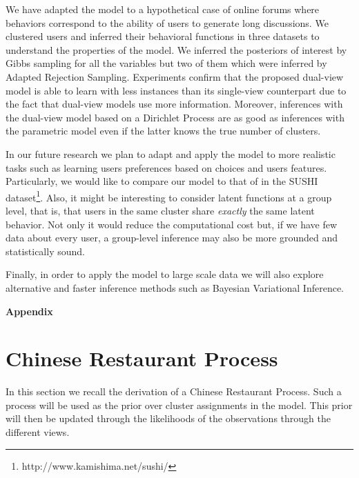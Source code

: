 \documentclass[smallextended]{svjour3}          %
\begin{document}
We have adapted the model to a hypothetical case of online forums where behaviors correspond to the ability of users to generate long discussions. We clustered users and inferred their behavioral functions in three datasets to understand the properties of the model. We inferred the posteriors of interest by Gibbs sampling for all the variables but two of them which were inferred by Adapted Rejection Sampling. Experiments confirm that the proposed dual-view model is able to learn with less instances than its single-view counterpart due to the fact that dual-view models use more information. Moreover, inferences with the dual-view model based on a Dirichlet Process are as good as inferences with the parametric model even if the latter knows the true number of clusters.

In our future research we plan to adapt and apply the model to more realistic tasks such as learning users preferences based on choices and users features. Particularly, we would like to compare our model to that of \cite{Abbasnejad2013a} in the SUSHI dataset\footnote{http://www.kamishima.net/sushi/}. Also, it
might be interesting to consider latent functions at a group level, that is, that users in the same cluster share \textit{exactly} the same latent behavior. Not only it would reduce the computational cost but, if we have few data about every user, a group-level inference may also be more grounded and statistically sound.

Finally, in order to apply the model to large scale data we will also explore alternative and faster inference methods such as Bayesian Variational Inference.

\newpage
\appendix
\noindent \textbf{\Large Appendix}
\vspace{-0.1cm}
\section{Chinese Restaurant Process}
In this section we recall the derivation of a Chinese Restaurant Process. Such a process will be used as the prior over cluster assignments in the model. This prior will then be updated through the likelihoods of the observations through the different views. 
\end{document}
